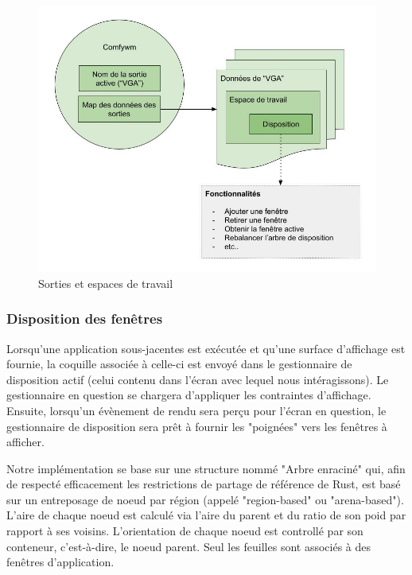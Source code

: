 \documentclass[titlepage]{article}
\begin{document}
\begin{figure}[H]
	\centering
	\includegraphics[width=\textwidth]{sorties_et_espaces_de_travail.jpg}
	\caption{Sorties et espaces de travail}
\end{figure}

\subsubsection{Disposition des fenêtres}
\par
Lorsqu'une application sous-jacentes est exécutée et qu'une surface d'affichage est fournie, la coquille associée à celle-ci est envoyé dans le gestionnaire de disposition actif (celui contenu dans l'écran avec lequel nous intéragissons). Le gestionnaire en question se chargera d'appliquer les contraintes d'affichage. Ensuite, lorsqu'un évènement de rendu sera perçu pour l'écran en question, le gestionnaire de disposition sera prêt à fournir les "poignées" vers les fenêtres à afficher.
\bigskip

\par
Notre implémentation se base sur une structure nommé "Arbre enraciné" qui, afin de respecté efficacement les restrictions de partage de référence de Rust, est basé sur un entreposage de noeud par région (appelé "region-based" ou "arena-based"). L'aire de chaque noeud est calculé via l'aire du parent et du ratio de son poid par rapport à ses voisins. L'orientation de chaque noeud est controllé par son conteneur, c'est-à-dire, le noeud parent. Seul les feuilles sont associés à des fenêtres d'application.
\bigskip
\end{document}
